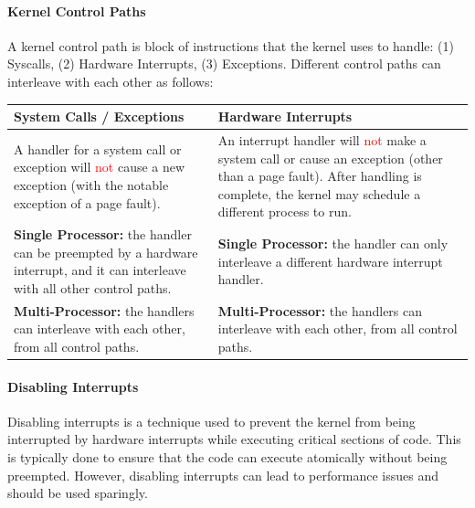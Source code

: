 \documentclass[openany,12pt]{book}
\newcommand{\red}[1]{\textcolor{Red}{#1}}
\begin{document}
\paragraph{Kernel Control Paths} A kernel control path is block of instructions that the kernel uses to handle: (1) Syscalls, (2) Hardware Interrupts, (3) Exceptions. Different control paths can interleave with each other as follows:



\begin{samepage}
  \begin{center}
    \begin{tabular}{|>{\raggedright\arraybackslash}p{6.5cm}|
      >{\raggedright\arraybackslash}p{6.5cm}|}
      \hline
      \rowcolor{blue!30}
      \textbf{System Calls / Exceptions} & \textbf{Hardware Interrupts} \\
      \hline
      A handler for a system call or exception will \red{not} cause a new exception (with the notable exception of a page fault).
      &
      An interrupt handler will \red{not} make a system call or cause an exception (other than a page fault). After handling is complete, the kernel may schedule a different process to run.
      \\
      \hline
      \textbf{Single Processor:} the handler can be preempted by a hardware interrupt, and it can interleave with all other control paths.
      &
      \textbf{Single Processor:} the handler can only interleave a different hardware interrupt handler.
      \\
      \hline
      \textbf{Multi-Processor:} the handlers can interleave with each other, from all control paths.
      &
      \textbf{Multi-Processor:} the handlers can interleave with each other, from all control paths.
      \\
      \hline
    \end{tabular}
  \end{center}
\end{samepage}


\paragraph{Disabling Interrupts} Disabling interrupts is a technique used to prevent the kernel from being interrupted by hardware interrupts while executing critical sections of code. This is typically done to ensure that the code can execute atomically without being preempted. However, disabling interrupts can lead to performance issues and should be used sparingly.
\end{document}
